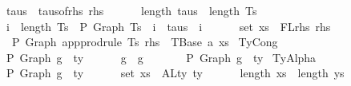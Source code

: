 \begin{isabellebody}
\ \ \ \ \ taus\ {\isacharequal}{\kern0pt}\ taus{\isacharunderscore}{\kern0pt}of{\isacharunderscore}{\kern0pt}rhs\ rhs\ {\isacharequal}{\kern0pt}{\isacharequal}{\kern0pt}{\isachargreater}{\kern0pt}\isanewline
\ \ \ \ \ length\ taus\ {\isacharequal}{\kern0pt}\ length\ Ts\ {\isacharequal}{\kern0pt}{\isacharequal}{\kern0pt}{\isachargreater}{\kern0pt}\isanewline
\ \ \ \ \ {\isacharparenleft}{\kern0pt}{\isasymforall}i\ {\isacharless}{\kern0pt}\ length\ Ts{\isachardot}{\kern0pt}\ {\isasymGamma}\ {\isasymturnstile}{\isacharbraceleft}{\kern0pt}P{\isacharbraceright}{\kern0pt}\ {\isacharparenleft}{\kern0pt}Graph\ {\isacharparenleft}{\kern0pt}Ts\ {\isacharbang}{\kern0pt}\ i{\isacharparenright}{\kern0pt}{\isacharparenright}{\kern0pt}\ {\isacharcolon}{\kern0pt}\ taus\ {\isacharbang}{\kern0pt}\ i{\isacharparenright}{\kern0pt}\ {\isacharequal}{\kern0pt}{\isacharequal}{\kern0pt}{\isachargreater}{\kern0pt}\isanewline
\ \ \ \ \ set\ xs\ {\isacharequal}{\kern0pt}\ FLrhs\ rhs\ {\isacharequal}{\kern0pt}{\isacharequal}{\kern0pt}{\isachargreater}{\kern0pt}\isanewline
\ \ \ \ \ {\isasymGamma}\ {\isasymturnstile}{\isacharbraceleft}{\kern0pt}P{\isacharbraceright}{\kern0pt}\ {\isacharparenleft}{\kern0pt}Graph\ {\isacharparenleft}{\kern0pt}app{\isacharunderscore}{\kern0pt}prodrule\ Ts\ rhs{\isacharparenright}{\kern0pt}{\isacharparenright}{\kern0pt}\ {\isacharcolon}{\kern0pt}\ TBase\ a\ xs{\isachardoublequoteclose}\isanewline
{\isacharbar}{\kern0pt}\ TyCong{\isacharcolon}{\kern0pt}\isanewline
\ \ \ \ {\isachardoublequoteopen}{\isasymGamma}\ {\isasymturnstile}{\isacharbraceleft}{\kern0pt}P{\isacharbraceright}{\kern0pt}\ Graph\ g{}\ {\isacharcolon}{\kern0pt}\ ty\ {\isacharequal}{\kern0pt}{\isacharequal}{\kern0pt}{\isachargreater}{\kern0pt}\isanewline
\ \ \ \ \ g{}\ {\isasymsimeq}\ g{}\ {\isacharequal}{\kern0pt}{\isacharequal}{\kern0pt}{\isachargreater}{\kern0pt}\isanewline
\ \ \ \ \ {\isasymGamma}\ {\isasymturnstile}{\isacharbraceleft}{\kern0pt}P{\isacharbraceright}{\kern0pt}\ Graph\ g{}\ {\isacharcolon}{\kern0pt}\ ty{\isachardoublequoteclose}\isanewline
{\isacharbar}{\kern0pt}\ TyAlpha{\isacharcolon}{\kern0pt}\isanewline
\ \ \ \ {\isachardoublequoteopen}{\isasymGamma}{}\ {\isasymturnstile}{\isacharbraceleft}{\kern0pt}P{\isacharbraceright}{\kern0pt}\ Graph\ g\ {\isacharcolon}{\kern0pt}\ ty\ {\isacharequal}{\kern0pt}{\isacharequal}{\kern0pt}{\isachargreater}{\kern0pt}\isanewline
\ \ \ \ \ set\ xs\ {\isacharequal}{\kern0pt}\ ALty\ ty\ {\isacharequal}{\kern0pt}{\isacharequal}{\kern0pt}{\isachargreater}{\kern0pt}\isanewline
\ \ \ \ \ length\ xs\ {\isacharequal}{\kern0pt}\ length\ ys\ {\isacharequal}{\kern0pt}{\isacharequal}{\kern0pt}{\isachargreater}{\kern0pt}\isanewline

\end{isabellebody}
